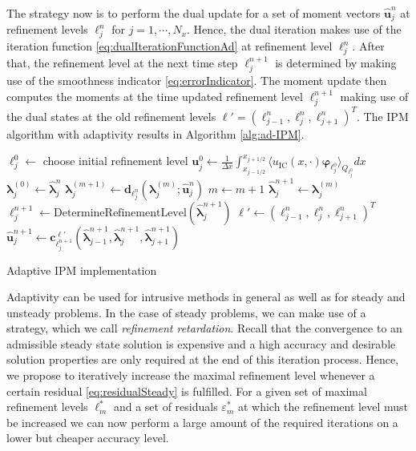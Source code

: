 The strategy now is to perform the dual update for a set of moment vectors $\bm{\hat u}_j^n$ at refinement levels $\ell_j^n$ for $j = 1,\cdots,N_x$. Hence, the dual iteration makes use of the iteration function \eqref{eq:dualIterationFunctionAd} at refinement level $\ell_j^n$. After that, the refinement level at the next time step $\ell_j^{n+1}$ is determined by making use of the smoothness indicator \eqref{eq:errorIndicator}. The moment update then computes the moments at the time updated refinement level $\ell_j^{n+1}$ making use of the dual states at the old refinement levels $\bm{\ell}' = (\ell_{j-1}^n,\ell_{j}^n,\ell_{j+1}^n)^T$. The IPM algorithm with adaptivity results in Algorithm \ref{alg:ad-IPM}.
\begin{algorithm}[H]
\begin{algorithmic}[1]
\State $\ell_j^0 \leftarrow$ choose initial refinement level
\State $\bm{u}_j^0 \leftarrow \frac{1}{\Delta x} \int_{x_{j-1/ 2}}^{x_{j+1/ 2}} \langle u_{\text{IC}}(x, \cdot) \bm{\varphi}_{\ell_j^0} \rangle_{Q_{\ell_j^0}} dx$
\EndFor
{}
\State $\bm{\lambda}_j^{(0)} \leftarrow \bm{\hat \lambda}_j^{n}$
\State $\bm{\lambda}_j^{(m+1)} \leftarrow \bm{d}_{\ell_j^n}(\bm{\lambda}_{j}^{(m)};\bm{\hat u}_j^{n})$
\State $m \leftarrow m+1$
\EndWhile
\State $\bm{\hat \lambda}_j^{n+1} \leftarrow \bm{\lambda}_j^{(m)}$
\State $\ell_j^{n+1}\leftarrow \text{DetermineRefinementLevel}\left(\bm{\hat \lambda}_j^{n+1}\right)$
\EndFor
{}
\State $\bm\ell' \leftarrow (\ell_{j-1}^n,\ell_{j}^n,\ell_{j+1}^n)^T$
\State $\bm{\hat u}_j^{n+1} \leftarrow \bm{c}_{\ell_j^{n+1}}^{\bm\ell'}(\bm{\hat \lambda}_{j-1}^{n+1},\bm{\hat \lambda}_j^{n+1},\bm{\hat \lambda}_{j+1}^{n+1})$
\EndFor
\EndFor
\end{algorithmic}
\caption{Adaptive IPM implementation}
\label{alg:ad-IPM}
\end{algorithm}
Adaptivity can be used for intrusive methods in general as well as for steady and unsteady problems. In the case of steady problems, we can make use of a strategy, which we call \textit{refinement retardation}. Recall that the convergence to an admissible steady state solution is expensive and a high accuracy and desirable solution properties are only required at the end of this iteration process. Hence, we propose to iteratively increase the maximal refinement level whenever a certain residual \eqref{eq:residualSteady} is fulfilled. For a given set of maximal refinement levels $\ell_m^*$ and a set of residuals $\varepsilon_m^*$ at which the refinement level must be increased we can now perform a large amount of the required iterations on a lower but cheaper accuracy level.
